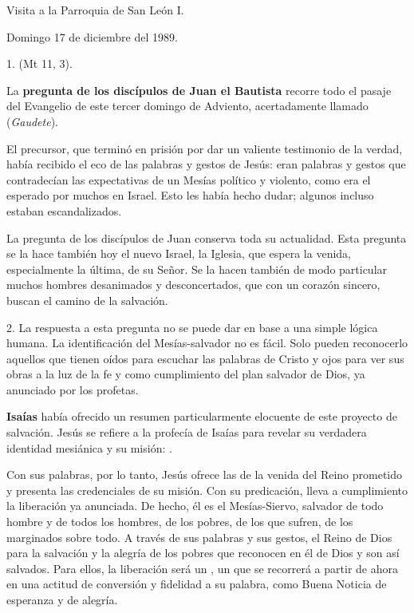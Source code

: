 Visita a la Parroquia de San León I.

Domingo 17 de diciembre del 1989.

1.  (Mt 11, 3).

La \textbf{pregunta de los discípulos de Juan el Bautista} recorre todo el pasaje del Evangelio de este tercer domingo de Adviento, acertadamente llamado  (\emph{Gaudete}).

El precursor, que terminó en prisión por dar un valiente testimonio de la verdad, había recibido el eco de las palabras y gestos de Jesús: eran palabras y gestos que contradecían las expectativas de un Mesías político y violento, como era el esperado por muchos en Israel. Esto les había hecho dudar; algunos incluso estaban escandalizados.

 La pregunta de los discípulos de Juan conserva toda su actualidad. Esta pregunta se la hace también hoy el nuevo Israel, la Iglesia, que espera la venida, especialmente la última, de su Señor. Se la hacen también de modo particular muchos hombres desanimados y desconcertados, que con un corazón sincero, buscan el camino de la salvación.

2. La respuesta a esta pregunta no se puede dar en base a una simple lógica humana. La identificación del Mesías-salvador no es fácil. Solo pueden reconocerlo aquellos que tienen oídos para escuchar las palabras de Cristo y ojos para ver sus obras a la luz de la fe y como cumplimiento del plan salvador de Dios, ya anunciado por los profetas.

\textbf{Isaías} había ofrecido un resumen particularmente elocuente de este proyecto de salvación. Jesús se refiere a la profecía de Isaías para revelar su verdadera identidad mesiánica y su misión: .

Con sus palabras, por lo tanto, Jesús ofrece las  de la venida del Reino prometido y presenta las credenciales de su misión. Con su predicación, lleva a cumplimiento la liberación ya anunciada. De hecho, él es el Mesías-Siervo, salvador de todo hombre y de todos los hombres, de los pobres, de los que sufren, de los marginados sobre todo. A través de sus palabras y sus gestos, el Reino de Dios  para la salvación y la alegría de los pobres que reconocen en él  de Dios y son así salvados. Para ellos, la liberación será un , un  que se recorrerá a partir de ahora en una actitud de conversión y fidelidad a su palabra, como Buena Noticia de esperanza y de alegría.

